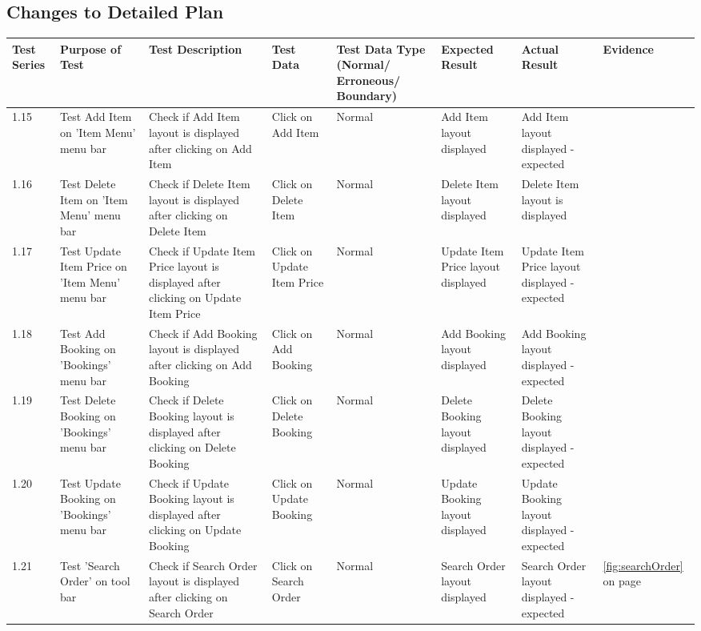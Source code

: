 \begin{landscape}
\subsection{Changes to Detailed Plan}

\begin{center}
    \begin{longtable}{|p{1.5cm}|p{2.5cm}|p{2.5cm}|p{2cm}|p{2cm}|p{2cm}|p{2cm}|p{2cm}|}
        \hline
        \textbf{Test Series} & \textbf{Purpose of Test} & \textbf{Test Description} & \textbf{Test Data} & \textbf{Test Data Type (Normal/ Erroneous/ Boundary)} & \textbf{Expected Result} & \textbf{Actual Result} & \textbf{Evidence}\\ \hline
       1.15 & Test Add Item on 'Item Menu' menu bar & Check if Add Item layout is displayed after clicking on Add Item & Click on Add Item & Normal & Add Item layout displayed & Add Item layout displayed - expected &  \\ \hline
       1.16 & Test Delete Item on 'Item Menu' menu bar & Check if Delete Item layout is displayed after clicking on Delete Item & Click on Delete Item & Normal & Delete Item layout displayed & Delete Item layout is displayed &  \\ \hline
       1.17 & Test Update Item Price on 'Item Menu' menu bar & Check if Update Item Price layout is displayed after clicking on Update Item Price & Click on Update Item Price & Normal & Update Item Price layout displayed & Update Item Price layout displayed - expected & \\ \hline
       1.18 & Test Add Booking on 'Bookings' menu bar & Check if Add Booking layout is displayed after clicking on Add Booking & Click on Add Booking & Normal & Add Booking layout displayed &Add Booking layout displayed - expected &  \\ \hline
       1.19 & Test Delete Booking on 'Bookings' menu bar & Check if Delete Booking layout is displayed after clicking on Delete Booking & Click on Delete Booking & Normal & Delete Booking layout displayed & Delete Booking layout displayed - expected & \\ \hline
       1.20 & Test Update Booking on 'Bookings' menu bar & Check if Update Booking layout is displayed after clicking on Update Booking & Click on Update Booking & Normal & Update Booking layout displayed & Update Booking layout displayed - expected &  \\ \hline
       1.21 & Test 'Search Order' on tool bar & Check if Search Order layout is displayed after clicking on Search Order & Click on Search Order & Normal & Search Order layout displayed & Search Order layout displayed - expected & \ref{fig:searchOrder} on page \pageref{fig:searchOrder} \\ \hline

\end{longtable}
\end{center}
\end{landscape}
